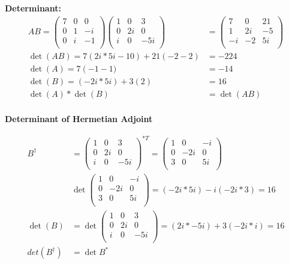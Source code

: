 \documentclass[10pt]{article} %
\begin{document}
\textbf{Determinant:}
\begin{align*}
  AB =
  \begin{pmatrix}
    7 & 0 & 0\\
    0 & 1 & -i\\
    0 & i & -1\\
  \end{pmatrix}
  \begin{pmatrix}
    1 & 0 & 3\\
    0 & 2i & 0\\
    i & 0 & -5i\\
  \end{pmatrix}
  &=
  \begin{pmatrix}
    7 & 0 & 21\\
    1 & 2i & -5\\
    -i & -2 & 5i\\
  \end{pmatrix}\\
  \det(AB) = 7\left(2i*5i - 10\right) + 21\left(-2-2\right) &= -224\\
  \det(A) = 7\left(-1-1) &= -14\\
  \det(B) = (-2i*5i) + 3(2)&= 16\\
  \det(A)*\det(B) &= \det(AB)\\
\end{align*}

\textbf{Determinant of Hermetian Adjoint}

\begin{align*}
  B^\dagger &=
  \begin{pmatrix}
    1 & 0 & 3\\
    0 & 2i & 0\\
    i & 0 & -5i\\
  \end{pmatrix}^{*T}
  =
  \begin{pmatrix}
    1 & 0 & -i\\
    0 & -2i & 0\\
    3 & 0 & 5i\\
  \end{pmatrix}\\
  &\det
  \begin{pmatrix}
    1 & 0 & -i\\
    0 & -2i & 0\\
    3 & 0 & 5i\\
  \end{pmatrix}
  = (-2i*5i) - i(-2i*3) = 16\\
  \det(B) &=
  \det
  \begin{pmatrix}
    1 & 0 & 3\\
    0 & 2i & 0\\
    i & 0 & -5i\\
  \end{pmatrix}
  = (2i*-5i) + 3(-2i*i) = 16\\
  det(B^\dagger) &= \det{B}^*
\end{align*}
\end{document}
